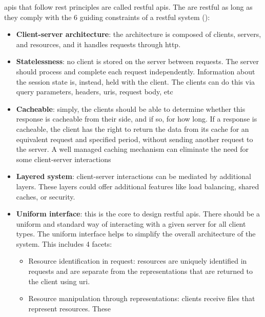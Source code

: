 \begin{multicols}{2}
      \acrshort{api}s that follow \acrshort{rest} principles are called \acrshort{rest}ful \acrshort{api}s. The
      are \acrshort{rest}ful as long as they comply with the 6 guiding constraints of a \acrshort{rest}ful system
      (\cite{restguidingprinciples}):
      \begin{itemize}
            \item \textbf{Client-server architecture}: the architecture is composed of clients, servers, and 
                  resources, and it handles requests through \acrshort{http}.
            \item \textbf{Statelessness}: no client is stored on the server between requests. The server should process
                  and complete each request independently. Information about the session state is, instead, held with the 
                  client. The clients can do this via query parameters, headers, \acrshort{uri}s, request body, \acrshort{etc}
            \item \textbf{Cacheable}: simply, the clients should be able to determine whether this response is cacheable
                  from their side, and if so, for how long. If a response is cacheable, the client has the right to return the 
                  data from its cache for an equivalent request and specified period, without sending another request to the 
                  server. A well managed caching mechanism can eliminate the need for some client-server interactions
            \item \textbf{Layered system}: client-server interactions can be mediated by additional layers. These 
                  layers could offer additional features like load balancing, shared caches, or security.
            \item \textbf{Uniform interface}: this is the core to design \acrshort{rest}ful \acrshort{api}s. 
                  There should be a uniform and standard way of interacting with a given server for all client
                  types. The uniform interface helps to simplify the overall architecture of the system. This includes
                  4 facets:
                  \begin{itemize}
                        \item Resource identification in request: resources are uniquely identified in requests and are separate 
                              from the representations that are returned to the client using \acrshort{uri}.
                        \item Resource manipulation through representations: clients receive files that represent resources. These

\end{itemize}
\end{itemize}
\end{multicols}
